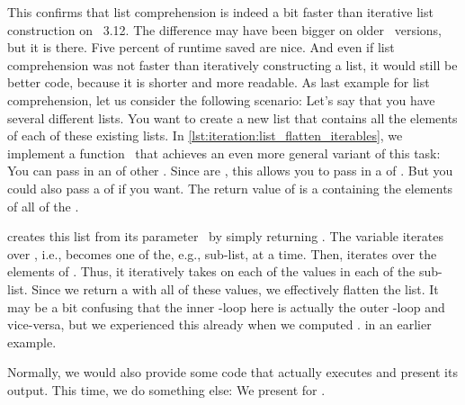 This confirms that list comprehension is indeed a bit faster than iterative list construction on \python~3.12.
The difference may have been bigger on older \python\ versions, but it is there.
Five percent of runtime saved are nice.
And even if list comprehension was not faster than iteratively constructing a list, it would still be better code, because it is shorter and more readable.%
%
\FloatBarrier%
\endhsection%
%
%
%
%
%
%
As last example for list comprehension, let us consider the following scenario:
Let's say that you have several different lists.
You want to create a new list that contains all the elements of each of these existing lists.
In \cref{lst:iteration:list_flatten_iterables}, we implement a function~ that achieves an even more general variant of this task:
You can pass in an  of other .
Since  are , this allows you to pass in a  of .
But you could also pass a  of  if you want.
The return value of  is a  containing the elements of all of the  .%
%
\begin{sloppypar}%
 creates this list from its parameter~ by simply returning .
The variable  iterates over , i.e., becomes one of the, e.g., sub-list, at a time.
Then,  iterates over the elements of .
Thus, it iteratively takes on each of the values in each of the sub-list.
Since we return a  with all of these values, we effectively flatten the list.
It may be a bit confusing that the inner -loop here is actually the outer -loop and vice-versa, but we experienced this already when we computed . in an earlier example.%
\end{sloppypar}%
%
Normally, we would also provide some code that actually executes  and present its output.
This time, we do something else:
We present  for .

